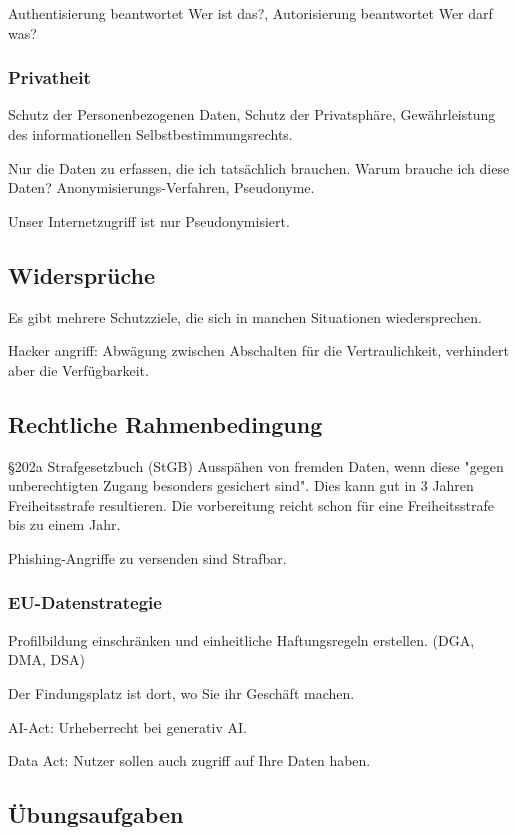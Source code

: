 \documentclass[a4paper]{article}
\begin{document}
Authentisierung beantwortet Wer ist das?, Autorisierung beantwortet Wer darf was?

\subsubsection{Privatheit}

Schutz der Personenbezogenen Daten, Schutz der Privatsphäre, Gewährleistung des informationellen Selbstbestimmungsrechts.

Nur die Daten zu erfassen, die ich tatsächlich brauchen. Warum brauche ich diese Daten? Anonymisierungs-Verfahren, Pseudonyme.

Unser Internetzugriff ist nur Pseudonymisiert.

\subsection{Widersprüche}

Es gibt mehrere Schutzziele, die sich in manchen Situationen wiedersprechen.

Hacker angriff: Abwägung zwischen Abschalten für die Vertraulichkeit, verhindert aber die Verfügbarkeit.


\subsection{Rechtliche Rahmenbedingung}

§202a Strafgesetzbuch (StGB) Ausspähen von fremden Daten, wenn diese "gegen unberechtigten Zugang besonders gesichert sind". Dies kann gut in 3 Jahren Freiheitsstrafe resultieren. Die vorbereitung reicht schon für eine Freiheitsstrafe bis zu einem Jahr.

Phishing-Angriffe zu versenden sind Strafbar.

\subsubsection{EU-Datenstrategie}

Profilbildung einschränken und einheitliche Haftungsregeln erstellen. (DGA, DMA, DSA)

Der Findungsplatz ist dort, wo Sie ihr Geschäft machen.

AI-Act: Urheberrecht bei generativ AI.

Data Act: Nutzer sollen auch zugriff auf Ihre Daten haben.

\subsection{Übungsaufgaben}
\end{document}
